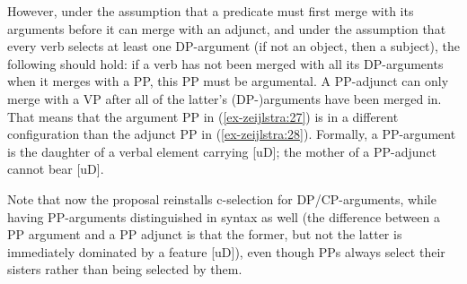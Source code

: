 \documentclass[output=paper
,modfonts
,nonflat]{langsci/langscibook}
\begin{document}
However, under the assumption that a predicate must first merge with its arguments before it can merge with an adjunct, and under the assumption that every verb selects at least one DP-argument (if not an object, then a subject), the following should hold: if a verb has not been merged with all its DP-arguments when it merges with a PP, this PP must be argumental. A PP-adjunct can only merge with a VP after all of the latter’s (DP-)arguments have been merged in. That means that the argument PP in (\ref{ex-zeijlstra:27}) is in a different configuration than the adjunct PP in (\ref{ex-zeijlstra:28}). Formally, a PP-argument is the daughter of a verbal element carrying [uD]; the mother of a PP-adjunct cannot bear [uD]. 

\begin{figure}[!h]
	\begin{exe}
	\end{exe} \vspace{-0.8cm}
\end{figure} 
\begin{figure}[!h]
	\begin{exe}
	\end{exe} \vspace{-0.7cm}
\end{figure} 
\noindent Note that now the proposal reinstalls c-selection for DP/CP-arguments, while having PP-arguments distinguished in syntax as well (the difference between a PP argument and a PP adjunct is that the former, but not the latter is immediately dominated by a feature [uD]), even though PPs always select their sisters rather than being selected by them.
\end{document}
